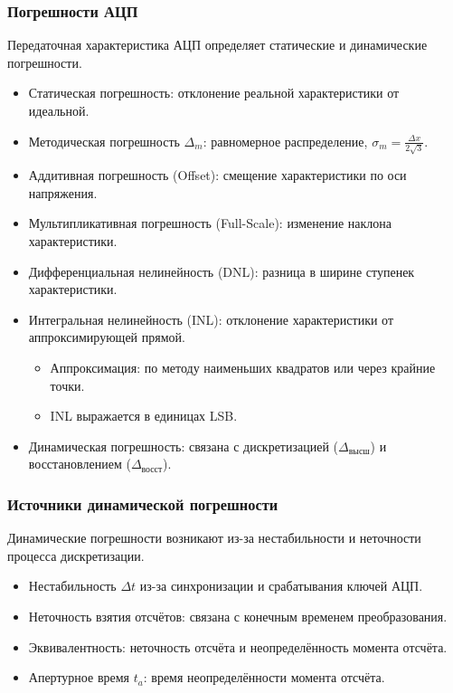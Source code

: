 	\subsubsection{Погрешности АЦП}
	Передаточная характеристика АЦП определяет статические и динамические погрешности.
	\begin{itemize}
		\item Статическая погрешность: отклонение реальной характеристики от идеальной.
		\item Методическая погрешность $\Delta_m$: равномерное распределение, $\sigma_m = \frac{\Delta x}{2\sqrt{3}}$.
		\item Аддитивная погрешность (Offset): смещение характеристики по оси напряжения.
		\item Мультипликативная погрешность (Full-Scale): изменение наклона характеристики.
		\item Дифференциальная нелинейность (DNL): разница в ширине ступенек характеристики.
		\item Интегральная нелинейность (INL): отклонение характеристики от аппроксимирующей прямой.
		\begin{itemize}
			\item Аппроксимация: по методу наименьших квадратов или через крайние точки.
			\item INL выражается в единицах LSB.
		\end{itemize}
		\item Динамическая погрешность: связана с дискретизацией ($\Delta_{\text{высш}}$) и восстановлением ($\Delta_{\text{восст}}$).
	\end{itemize}
	
	\subsubsection{Источники динамической погрешности}
	Динамические погрешности возникают из-за нестабильности и неточности процесса дискретизации.
	\begin{itemize}
		\item Нестабильность $\Delta t$ из-за синхронизации и срабатывания ключей АЦП.
		\item Неточность взятия отсчётов: связана с конечным временем преобразования.
		\item Эквивалентность: неточность отсчёта и неопределённость момента отсчёта.
		\item Апертурное время $t_a$: время неопределённости момента отсчёта.
	\end{itemize}
	
